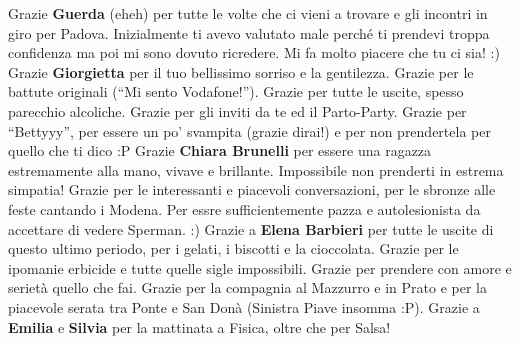 \documentclass[10pt]{amsart}
\newcommand{\n}[1]{{\Large \bf #1}}
\begin{document}
Grazie \n{Guerda} (eheh) per tutte le volte che ci vieni a trovare e gli incontri in giro per Padova. Inizialmente ti avevo valutato male perché ti prendevi troppa confidenza ma poi mi sono dovuto ricredere. Mi fa molto piacere che tu ci sia! :) Grazie \n{Giorgietta} per il tuo bellissimo sorriso e la gentilezza. Grazie per le battute originali (``Mi sento Vodafone!''). Grazie per tutte le uscite, spesso parecchio alcoliche. Grazie per gli inviti da te ed il Parto-Party. Grazie per ``Bettyyy'', per essere un po' svampita (grazie dirai!) e per non prendertela per quello che ti dico :P
Grazie \n{Chiara Brunelli} per essere una ragazza estremamente alla mano, vivave e brillante. Impossibile non prenderti in estrema simpatia! Grazie per le interessanti e piacevoli conversazioni, per le sbronze alle feste cantando i Modena. Per essre sufficientemente pazza e autolesionista da accettare di vedere Sperman. :)
Grazie a \n{Elena Barbieri} per tutte le uscite di questo ultimo periodo, per i gelati, i biscotti e la cioccolata. Grazie per le ipomanie erbicide e tutte quelle sigle impossibili. Grazie per prendere con amore e serietà quello che fai. Grazie per la compagnia al Mazzurro e in Prato e per la piacevole serata tra Ponte e San Donà (Sinistra Piave insomma :P). Grazie a \n{Emilia} e \n{Silvia} per la mattinata a Fisica, oltre che per Salsa!\\
\end{document}
